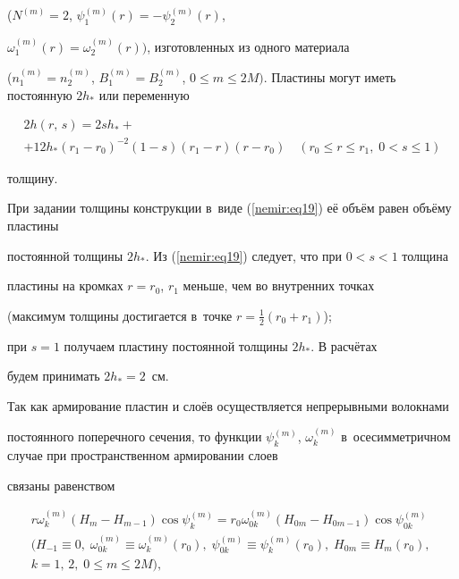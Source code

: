 ($N^{(m)} = 2$, $\psi _1^{(m)} (r) = - \psi _2^{(m)} (r)$, 

$\omega _1^{(m)} (r) = \omega _2^{(m)} (r))$, изготовленных из одного материала 

($n_1^{(m)} = n_2^{(m)} $, $B_1^{(m)} = B_2^{(m)} $, $0 \leqslant m 

\leqslant 2M)$. Пластины могут иметь постоянную $2h_ * $ или переменную

\begin{multline}

\label{nemir:eq19}

2h(r,\,s) = 2sh_ * + \\

+ 12h_ * ( r_1 - r_0 )^{ - 2}(1 - s)(r_1 - r)(r - r_0 )\quad 

(r_0 \leqslant r \leqslant r_1 ,\;0 < s \leqslant 1)

\end{multline}

толщину.





При задании толщины конструкции в~виде (\ref{nemir:eq19}) её объём равен объёму пластины 

постоянной толщины $2h_*$. Из (\ref{nemir:eq19}) следует, что при $0 < s < 1$ толщина 

пластины на кромках $r = r_0$, $r_1 $ меньше, чем во внутренних точках 

(максимум толщины достигается в~точке $r = \frac12(r_0 + r_1 )$); 

при $s = 1$ получаем пластину постоянной толщины $2h_ * $. В расчётах 

будем принимать $2h_ * = 2$~см.



Так как армирование пластин и слоёв осуществляется непрерывными волокнами 

постоянного поперечного сечения, то функции $\psi _k^{(m)} $, $\omega 

_k^{(m)} $ в~осесимметричном случае при пространственном армировании слоев 

связаны равенством

\begin{multline}

\label{nemir:eq20}

 r\omega _k^{(m)} \left( {H_m - H_{m - 1} } \right)\cos \psi _k^{(m)} = r_0 

\omega _{0k}^{(m)} \left( {H_{0m} - H_{0m - 1} } \right)\cos \psi 

_{0k}^{(m)} \\

(H_{ - 1} \equiv 0, \;  

\omega _{0k}^{(m)} \equiv \omega _k^{(m)} (r_0),\; 

\psi _{0k}^{(m)} \equiv \psi _k^{(m)} (r_0),\;

H_{0m} \equiv H_m \left( {r_0 } \right),\;\\

k = 1,\,2,\; 0 \leqslant m \leqslant 2M), 

\end{multline}

